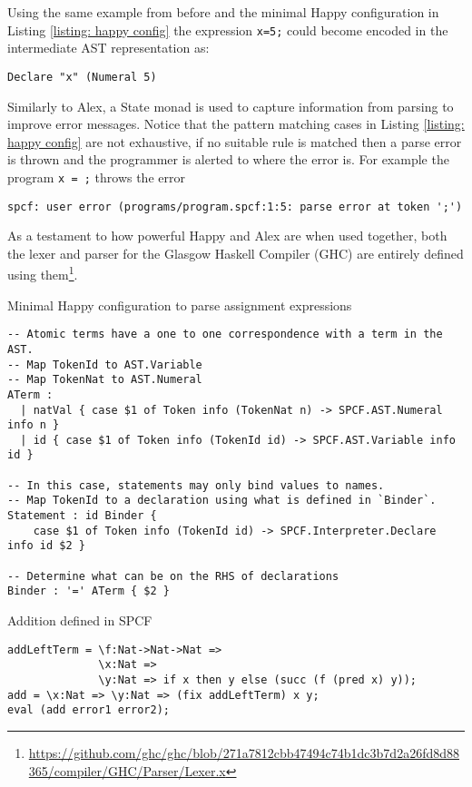 \documentclass[12pt,a4paper]{report}
\theoremstyle{definition}
\theoremstyle{remark}
\begin{document}
Using the same example from before and the minimal Happy configuration in Listing \ref{listing: happy config} the expression \lstinline{x=5;} could become encoded in the intermediate AST representation as: 
\begin{verbatim}
Declare "x" (Numeral 5)
\end{verbatim}

Similarly to Alex, a State monad is used to capture information from parsing to improve error messages. Notice that the pattern matching cases in Listing \ref{listing: happy config} are not exhaustive, if no suitable rule is matched then a parse error is thrown and the programmer is alerted to where the error is. For example the program \lstinline{x = ;} throws the error
\begin{verbatim}
spcf: user error (programs/program.spcf:1:5: parse error at token ';')
\end{verbatim}

As a testament to how powerful Happy and Alex are when used together, both the lexer and parser for the Glasgow Haskell Compiler (GHC) are entirely defined using them\footnote{\url{https://github.com/ghc/ghc/blob/271a7812cbb47494c74b1dc3b7d2a26fd8d88365/compiler/GHC/Parser/Lexer.x}}. 

\begin{listing}\label{listing: happy config}
\caption{Minimal Happy configuration to parse assignment expressions}
\begin{verbatim}
-- Atomic terms have a one to one correspondence with a term in the AST.
-- Map TokenId to AST.Variable
-- Map TokenNat to AST.Numeral 
ATerm :
  | natVal { case $1 of Token info (TokenNat n) -> SPCF.AST.Numeral info n }
  | id { case $1 of Token info (TokenId id) -> SPCF.AST.Variable info id }

-- In this case, statements may only bind values to names.
-- Map TokenId to a declaration using what is defined in `Binder`.
Statement : id Binder { 
    case $1 of Token info (TokenId id) -> SPCF.Interpreter.Declare info id $2 }

-- Determine what can be on the RHS of declarations
Binder : '=' ATerm { $2 }
\end{verbatim}
\end{listing}

\begin{listing}
\caption{Addition defined in SPCF}
\begin{verbatim}
addLeftTerm = \f:Nat->Nat->Nat => 
              \x:Nat => 
              \y:Nat => if x then y else (succ (f (pred x) y));
add = \x:Nat => \y:Nat => (fix addLeftTerm) x y;
eval (add error1 error2);
\end{verbatim}
\end{listing}
\end{document}
